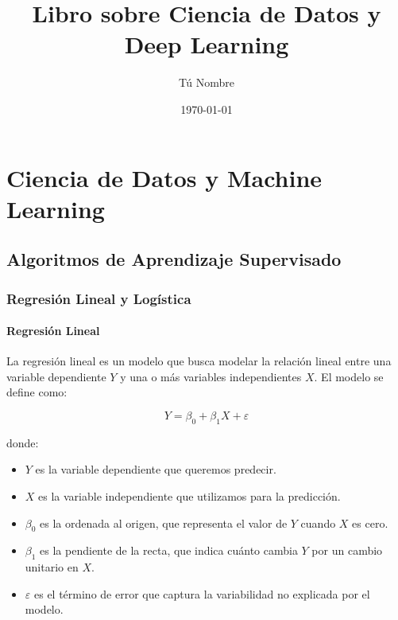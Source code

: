 \documentclass{book}
\begin{document}
\title{Libro sobre Ciencia de Datos y Deep Learning}
\author{Tú Nombre}
\date{\today}
\maketitle

\tableofcontents
\chapter{Ciencia de Datos y Machine Learning}

\section{Algoritmos de Aprendizaje Supervisado}

\subsection{Regresión Lineal y Logística}
\subsubsection{Regresión Lineal}

La regresión lineal es un modelo que busca modelar la relación lineal entre una variable dependiente \(Y\) y una o más variables independientes \(X\). El modelo se define como:

\[
Y = \beta_0 + \beta_1 X + \varepsilon
\]

donde:
\begin{itemize}
    \item \(Y\) es la variable dependiente que queremos predecir.
    \item \(X\) es la variable independiente que utilizamos para la predicción.
    \item \(\beta_0\) es la ordenada al origen, que representa el valor de \(Y\) cuando \(X\) es cero.
    \item \(\beta_1\) es la pendiente de la recta, que indica cuánto cambia \(Y\) por un cambio unitario en \(X\).
    \item \(\varepsilon\) es el término de error que captura la variabilidad no explicada por el modelo.
\end{itemize}
\end{document}
